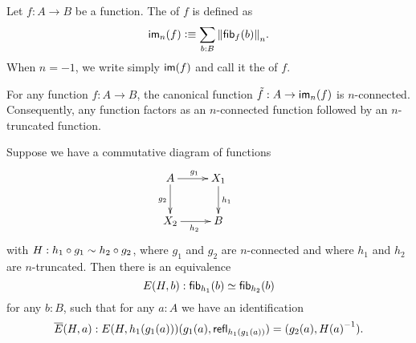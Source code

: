 \documentclass[hott-all.tex]{subfiles}
\begin{document}
% 
\begin{defn}
Let $f:A\to B$ be a function. The 
%
%
%
%
of $f$ is defined as
\begin{equation*}
\im_n(f)\defeq \sm{b:B} \trunc n{\hfib{f}b}.
\end{equation*}
When $n=-1$, we write simply $\mathsf{im}(f)$ and call it the  of $f$.
\end{defn}
% 
\begin{lem}
For any function $f:A\to B$, the canonical function $\tilde{f}:A\to\mathsf{im}_n(f)$ is $n$-connected.
Consequently, any function factors as an $n$-connected function followed by an $n$-truncated function.
\end{lem}
% 
% 
% 
\begin{lem}
Suppose we have a commutative diagram of functions
\begin{equation*}
  \xymatrix{
    {A} \ar[r]^{g_1} \ar[d]_{g_2} &
    {X_1} \ar[d]^{h_1} &
    \\
    {X_2} \ar[r]_{h_2}
    &
    {B}
  }
\end{equation*}
with $H:h_1\circ g_1\sim h_2\circ g_2$, where $g_1$ and $g_2$ are $n$-connected and where $h_1$ and $h_2$ are $n$-truncated.
Then there is an equivalence
\begin{equation*}
E(H,b):{\mathsf{fib}}_{h_1}(b)\simeq{\mathsf{fib}}_{h_2}(b)
\end{equation*}
for any $b:B$, such that for any $a:A$ we have an identification
\[\overline{E}(H,a) :  E(H,h_1(g_1(a)))({g_1(a),\mathsf{refl}_{h_1(g_1(a))}}) = {\mathopen{}(g_2(a),\mathord{{H(a)}^{-1}})\mathclose{}}.\]
\end{lem}
\end{document}
